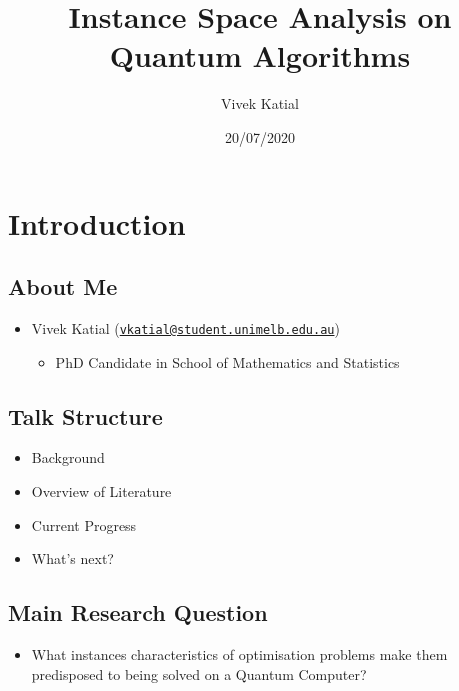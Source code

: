 \documentclass[
]{article}
\title{Instance Space Analysis on Quantum Algorithms}
\author{Vivek Katial}
\date{20/07/2020}
\providecommand{\tightlist}{%
  \setlength{\itemsep}{0pt}\setlength{\parskip}{0pt}}
\begin{document}
\maketitle

\hypertarget{introduction}{%
\section{Introduction}\label{introduction}}

\hypertarget{about-me}{%
\subsection{About Me}\label{about-me}}

\begin{itemize}
\tightlist
\item
  Vivek Katial
  (\href{mailto:vkatial@student.unimelb.edu.au}{\nolinkurl{vkatial@student.unimelb.edu.au}})

  \begin{itemize}
  \tightlist
  \item
    PhD Candidate in School of Mathematics and Statistics
  \end{itemize}
\end{itemize}

\hypertarget{talk-structure}{%
\subsection{Talk Structure}\label{talk-structure}}

\begin{itemize}
\tightlist
\item
  Background
\item
  Overview of Literature
\item
  Current Progress
\item
  What's next?
\end{itemize}

\hypertarget{main-research-question}{%
\subsection{Main Research Question}\label{main-research-question}}

\begin{itemize}
\tightlist
\item
  What instances characteristics of optimisation problems make them
  predisposed to being solved on a Quantum Computer?
\end{itemize}
\end{document}

